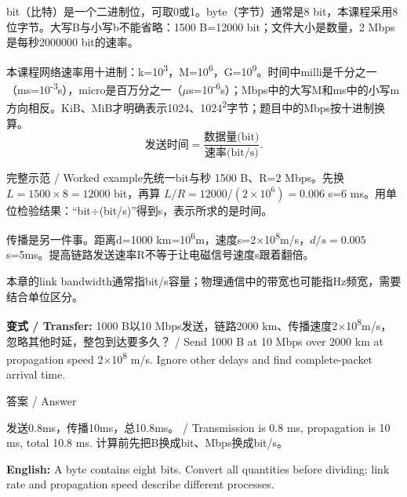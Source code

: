 

bit（比特）是一个二进制位，可取0或1。byte（字节）通常是8 bit，本课程采用8位字节。大写B与小写b不能省略：1500 B=12000 bit；文件大小是数量，2 Mbps是每秒2000000 bit的速率。


本课程网络速率用十进制：k=10\textsuperscript{3}，M=10\textsuperscript{6}，G=10\textsuperscript{9}。时间中milli是千分之一（ms=10\textsuperscript{-}\textsuperscript{3}s），micro是百万分之一（\ensuremath{\mu}s=10\textsuperscript{-}\textsuperscript{6}s）；Mbps中的大写M和ms中的小写m方向相反。KiB、MiB才明确表示1024、1024\textsuperscript{2}字节；题目中的Mbps按十进制换算。
\[
\text{发送时间}=\frac{\text{数据量(bit)}}{\text{速率(bit/s)}}.\tag{N.1}
\]


\begin{StudyBlock}{完整示范 / Worked example}{先统一bit与秒}
1500 B、R=2 Mbps。先换 \(L=1500\times8=12000\) bit，再算 \(L/R=12000/(2\times10^6)=0.006\) s=6 ms。用单位检验结果：“bit\ensuremath{\div}(bit/s)”得到s，表示所求的是时间。
\end{StudyBlock}


传播是另一件事。距离d=1000 km=10\textsuperscript{6}m，速度s=2\ensuremath{\times}10\textsuperscript{8}m/s，\(d/s=0.005\)s=5ms。提高链路发送速率R不等于让电磁信号速度s跟着翻倍。




本章的link bandwidth通常指bit/s容量；物理通信中的带宽也可能指Hz频宽，需要结合单位区分。


\textbf{变式 / Transfer:} 1000 B以10 Mbps发送，链路2000 km、传播速度2\ensuremath{\times}10\textsuperscript{8}m/s，忽略其他时延，整包到达要多久？ / Send 1000 B at 10 Mbps over 2000 km at propagation speed 2\ensuremath{\times}10\textsuperscript{8} m/s. Ignore other delays and find complete-packet arrival time.



\begin{StudySolution}{答案 / Answer}


发送0.8ms，传播10ms，总10.8ms。 / Transmission is 0.8 ms, propagation is 10 ms, total 10.8 ms. 计算前先把B换成bit、Mbps换成bit/s。


\end{StudySolution}


\textbf{English:} A byte contains eight bits. Convert all quantities before dividing; link rate and propagation speed describe different processes.


